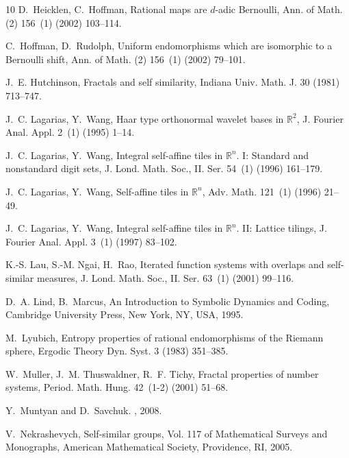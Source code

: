 \documentclass[12pt]{article}
\theoremstyle{definition}
\begin{document}
\begin{thebibliography}{10}
D.~Heicklen, C.~Hoffman, {Rational maps are $d$-adic Bernoulli}, Ann. of Math.
  (2) 156~(1) (2002) 103--114.

C.~Hoffman, D.~Rudolph, Uniform endomorphisms which are isomorphic to a
  {B}ernoulli shift, Ann. of Math. (2) 156~(1) (2002) 79--101.

J.~E. Hutchinson, {Fractals and self similarity}, Indiana Univ. Math. J. 30
  (1981) 713--747.

J.~C. Lagarias, Y.~Wang, {Haar type orthonormal wavelet bases in
  $\mathbb{R}^2$}, J. Fourier Anal. Appl. 2~(1) (1995) 1--14.

J.~C. Lagarias, Y.~Wang, {Integral self-affine tiles in $\mathbb{R}^n$. I:
  Standard and nonstandard digit sets}, J. Lond. Math. Soc., II. Ser. 54~(1)
  (1996) 161--179.

J.~C. Lagarias, Y.~Wang, {Self-affine tiles in $\mathbb{R}^n$}, Adv. Math.
  121~(1) (1996) 21--49.

J.~C. Lagarias, Y.~Wang, {Integral self-affine tiles in $\mathbb{R}^n$. II:
  Lattice tilings}, J. Fourier Anal. Appl. 3~(1) (1997) 83--102.

K.-S. Lau, S.-M. Ngai, H.~Rao, {Iterated function systems with overlaps and
  self-similar measures}, J. Lond. Math. Soc., II. Ser. 63~(1) (2001) 99--116.

D.~A. Lind, B.~Marcus, An Introduction to Symbolic Dynamics and Coding,
  Cambridge University Press, New York, NY, USA, 1995.

M.~Lyubich, {Entropy properties of rational endomorphisms of the Riemann
  sphere}, Ergodic Theory Dyn. Syst. 3 (1983) 351--385.

W.~Muller, J.~M. Thuswaldner, R.~F. Tichy, {Fractal properties of number
  systems}, Period. Math. Hung. 42~(1-2) (2001) 51--68.


Y.~Muntyan and D.~Savchuk.
, 2008.


V.~Nekrashevych, Self-similar groups, Vol. 117 of Mathematical Surveys and
  Monographs, American Mathematical Society, Providence, RI, 2005.


\end{thebibliography}
\end{document}
